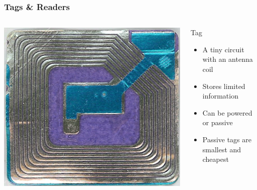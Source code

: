 \documentclass[unknownkeysallowed]{beamer}
\begin{document}
\begin{frame}
\frametitle{Tags \& Readers}

  \begin{columns}[T]
    \begin{column}{.5\textwidth}\centering
        \vspace{3mm}
        \includegraphics[width=\linewidth,height=0.2\textheight,keepaspectratio]{figures/wikimediatagWide.jpg}
    \end{column}
    \begin{column}{.5\textwidth}
        \begin{block}{Tag}
          \begin{itemize}
              \item{A tiny circuit with an antenna coil}
              \pause
              \item{Stores limited information}
              \pause
              \item{Can be powered or passive}
              \pause
              \item{Passive tags are smallest and cheapest}
              \pause
            \end{itemize}
          \end{block}
    \end{column}
  \end{columns}


\end{frame}
\end{document}
